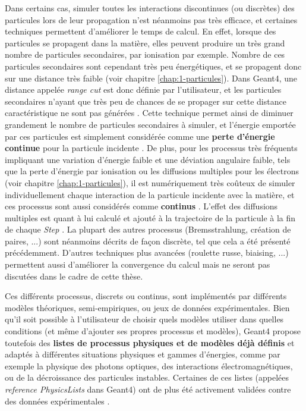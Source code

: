 \begin{refsection}
Dans certains cas, simuler toutes les interactions discontinues (ou discrètes) des particules lors de leur propagation n'est néanmoins pas très efficace, et certaines techniques permettent d'améliorer le temps de calcul. 
En effet, lorsque des particules se propagent dans la matière, elles peuvent produire un très grand nombre de particules secondaires, par ionisation par exemple. Nombre de ces particules secondaires sont cependant très peu énergétiques, et se propagent donc sur une distance très faible (voir chapitre \ref{chap:1-particules}). Dans Geant4, une distance appelée \textit{range cut} est donc définie par l'utilisateur, et les particules secondaires n'ayant que très peu de chances de se propager sur cette distance caractéristique ne sont pas générées \parencite{geant4_physref}. Cette technique permet ainsi de diminuer grandement le nombre de particules secondaires à simuler, et l'énergie emportée par ces particules est simplement considérée comme une \textbf{perte d'énergie continue} pour la particule incidente \parencite{geant4_physref}. 
De plus, pour les processus très fréquents impliquant une variation d'énergie faible et une déviation angulaire faible, tels que la perte d'énergie par ionisation ou les diffusions multiples pour les électrons (voir chapitre \ref{chap:1-particules}), il est numériquement très coûteux de simuler individuellement chaque interaction de la particule incidente avec la matière, et ces processus sont aussi considérés comme \textbf{continus} \parencite{geant4_physref}. L'effet des diffusions multiples est quant à lui calculé et ajouté à la trajectoire de la particule à la fin de chaque \textit{Step} \parencite{geant4_physref}. 
La plupart des autres processus (Bremsstrahlung, création de paires, ...) sont néanmoins décrits de façon discrète, tel que cela a été présenté précédemment.
D'autres techniques plus avancées (roulette russe, biaising, ...) permettent aussi d'améliorer la convergence du calcul mais ne seront pas discutées dans le cadre de cette thèse.

Ces différents processus, discrets ou continus, sont implémentés par différents modèles théoriques, semi-empiriques, ou jeux de données expérimentales. Bien qu'il soit possible à l'utilisateur de choisir quels modèles utiliser dans quelles conditions (et même d'ajouter ses propres processus et modèles), Geant4 propose toutefois des \textbf{listes de processus physiques et de modèles déjà définis} et adaptés à différentes situations physiques et gammes d'énergies, comme par exemple la physique des photons optiques, des interactions électromagnétiques, ou de la décroissance des particules instables. Certaines de ces listes (appelées \textit{reference PhysicsLists} dans Geant4) ont de plus été activement validées contre des données expérimentales \parencite{geant4_val}.


\end{refsection}
